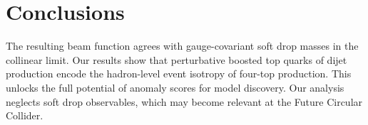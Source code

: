 \section{Conclusions}\label{sec:conclusions}

The resulting beam function agrees with gauge-covariant soft drop masses
in the collinear limit. Our results show that perturbative boosted top
quarks of dijet production encode the hadron-level event isotropy of
four-top production. This unlocks the full potential of anomaly scores
for model discovery. Our analysis neglects soft drop observables, which
may become relevant at the Future Circular Collider.

